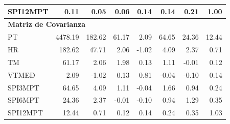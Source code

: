 \begin{table}[ht]
\begin{tabular}{lrrrrrrr}
SPI12MPT & 0.11 & 0.05 & 0.06 & 0.14 & 0.14 & 0.21 & 1.00 \\
\midrule
\multicolumn{8}{l}{\textbf{Matriz de Covarianza}} \\
\midrule
PT       & 4478.19 & 182.62 & 61.17 & 2.09 & 64.65 & 24.36 & 12.44 \\
HR       & 182.62 & 47.71 & 2.06 & -1.02 & 4.09 & 2.37 & 0.71 \\
TM       & 61.17 & 2.06 & 1.98 & 0.13 & 1.11 & -0.01 & 0.12 \\
VTMED    & 2.09 & -1.02 & 0.13 & 0.81 & -0.04 & -0.10 & 0.14 \\
SPI3MPT  & 64.65 & 4.09 & 1.11 & -0.04 & 1.66 & 0.94 & 0.24 \\
SPI6MPT  & 24.36 & 2.37 & -0.01 & -0.10 & 0.94 & 1.29 & 0.35 \\
SPI12MPT & 12.44 & 0.71 & 0.12 & 0.14 & 0.24 & 0.35 & 1.03 \\
\bottomrule
\end{tabular}
\end{table}




